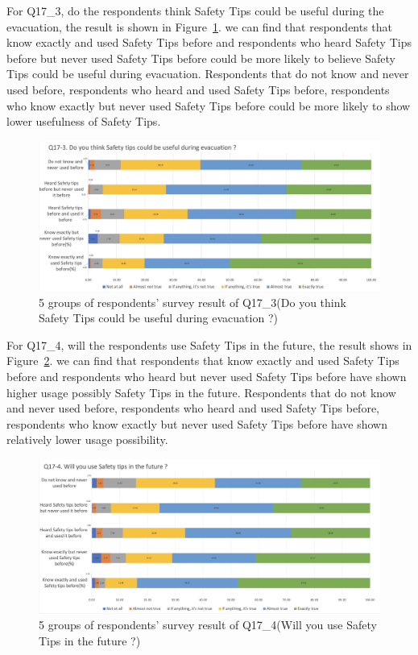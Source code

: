 For Q17\_3, do the respondents think Safety Tips could be useful during the evacuation, the result is shown in Figure~\ref{fig21}. we can find that respondents that know exactly and used Safety Tips before and respondents who heard Safety Tips before but never used Safety Tips before could be more likely to believe Safety Tips could be useful during evacuation. Respondents that do not know and never used before, respondents who heard and used Safety Tips before, respondents who know exactly but never used Safety Tips before could be more likely to show lower usefulness of Safety Tips. 

\begin{figure}[h]
  \includegraphics[width=0.8\linewidth]{Figure/Figure21.jpg}
  \centering
  \caption[5 groups of respondents' survey result of Q17\_3]{5 groups of respondents' survey result of Q17\_3(Do you think Safety Tips could be useful during evacuation ?)}
  \label{fig21}
\end{figure}

For Q17\_4, will the respondents use Safety Tips in the future, the result shows in Figure~\ref{fig22}. we can find that respondents that know exactly and used Safety Tips before and respondents who heard but never used Safety Tips before have shown higher usage possibly Safety Tips in the future. Respondents that do not know and never used before, respondents who heard and used Safety Tips before, respondents who know exactly but never used Safety Tips before have shown relatively lower usage possibility.

\begin{figure}[h]
  \includegraphics[width=0.8\linewidth]{Figure/Figure22.jpg}
  \centering
  \caption[5 groups of respondents' survey result of Q17\_4]{5 groups of respondents' survey result of Q17\_4(Will you use Safety Tips in the future ?)}
  \label{fig22}
\end{figure}

